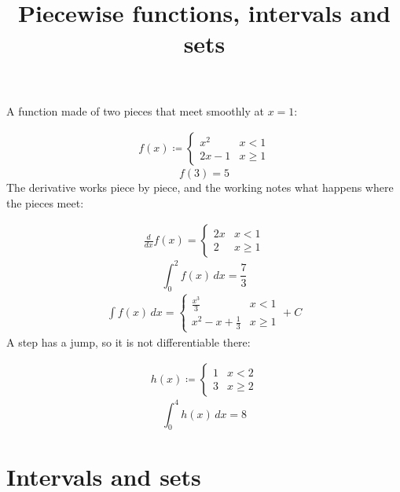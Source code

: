 \documentclass[11pt,a4paper]{article}
\title{Piecewise functions, intervals and sets}
\date{}
\theoremstyle{plain}
\theoremstyle{definition}
\theoremstyle{remark}
\begin{document}
\maketitle
A function made of two pieces that meet smoothly at $x = 1$:

\begin{align*}
  f(x) \coloneqq  \begin{cases} x^2 & x < 1 \\ 2x - 1 & x \ge 1 \end{cases}
\end{align*}
\begin{equation*}
  f(3) = 5
\end{equation*}
The derivative works piece by piece, and the working notes what happens where the pieces meet:

\begin{align*}
  \frac{d}{dx} f(x) = \begin{cases} 2 x & x < 1 \\ 2 & x \ge 1 \end{cases}
\end{align*}
\begin{equation*}
  \int_0^2 f(x) \, dx = \frac{7}{3}
\end{equation*}
\begin{align*}
  \int f(x) \, dx = \begin{cases} \frac{x^{3}}{3} & x < 1 \\ x^{2} - x + \frac{1}{3} & x \ge 1 \end{cases} + C
\end{align*}
A step has a jump, so it is not differentiable there:

\begin{align*}
  h(x) \coloneqq  \begin{cases} 1 & x < 2 \\ 3 & x \ge 2 \end{cases}
\end{align*}
\begin{equation*}
  \int_0^4 h(x) \, dx = 8
\end{equation*}
\section*{Intervals and sets}
\end{document}
